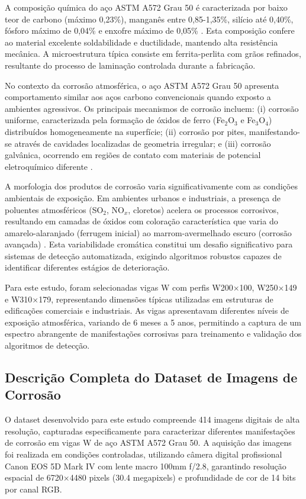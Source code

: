 \documentclass[12pt,a4paper,twoside]{article}
\begin{document}
A composição química do aço ASTM A572 Grau 50 é caracterizada por baixo teor de carbono (máximo 0,23\%), manganês entre 0,85-1,35\%, silício até 0,40\%, fósforo máximo de 0,04\% e enxofre máximo de 0,05\% \cite{astm2018a572}. Esta composição confere ao material excelente soldabilidade e ductilidade, mantendo alta resistência mecânica. A microestrutura típica consiste em ferrita-perlita com grãos refinados, resultante do processo de laminação controlada durante a fabricação.

No contexto da corrosão atmosférica, o aço ASTM A572 Grau 50 apresenta comportamento similar aos aços carbono convencionais quando exposto a ambientes agressivos. Os principais mecanismos de corrosão incluem: (i) corrosão uniforme, caracterizada pela formação de óxidos de ferro (Fe$_2$O$_3$ e Fe$_3$O$_4$) distribuídos homogeneamente na superfície; (ii) corrosão por pites, manifestando-se através de cavidades localizadas de geometria irregular; e (iii) corrosão galvânica, ocorrendo em regiões de contato com materiais de potencial eletroquímico diferente \cite{ahmad2006principles}.

A morfologia dos produtos de corrosão varia significativamente com as condições ambientais de exposição. Em ambientes urbanos e industriais, a presença de poluentes atmosféricos (SO$_2$, NO$_x$, cloretos) acelera os processos corrosivos, resultando em camadas de óxidos com coloração característica que varia do amarelo-alaranjado (ferrugem inicial) ao marrom-avermelhado escuro (corrosão avançada) \cite{melchers2018structural}. Esta variabilidade cromática constitui um desafio significativo para sistemas de detecção automatizada, exigindo algoritmos robustos capazes de identificar diferentes estágios de deterioração.

Para este estudo, foram selecionadas vigas W com perfis W200×100, W250×149 e W310×179, representando dimensões típicas utilizadas em estruturas de edificações comerciais e industriais. As vigas apresentavam diferentes níveis de exposição atmosférica, variando de 6 meses a 5 anos, permitindo a captura de um espectro abrangente de manifestações corrosivas para treinamento e validação dos algoritmos de detecção.

\subsection{Descrição Completa do Dataset de Imagens de Corrosão}
\label{subsec:dataset}

O dataset desenvolvido para este estudo compreende 414 imagens digitais de alta resolução, capturadas especificamente para caracterizar diferentes manifestações de corrosão em vigas W de aço ASTM A572 Grau 50. A aquisição das imagens foi realizada em condições controladas, utilizando câmera digital profissional Canon EOS 5D Mark IV com lente macro 100mm f/2.8, garantindo resolução espacial de 6720×4480 pixels (30.4 megapixels) e profundidade de cor de 14 bits por canal RGB.
\end{document}
